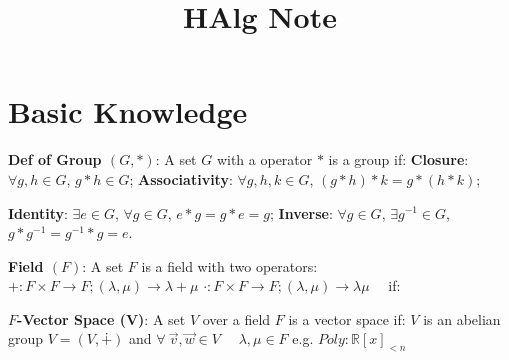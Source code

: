 \documentclass[9pt]{article}
\title{HAlg Note}
\author{}
\date{}
\begin{document}
\newcommand{\bij}{\stackrel{\sim}{\to}}
\newcommand{\oto}{\hookrightarrow}
\newcommand{\onto}{\twoheadrightarrow}

\maketitle
\thispagestyle{fancy}
\vspace{-3.5cm}

\fontsize{10pt}{11pt}\selectfont
\setlength{\parindent}{8pt}


\section{Basic Knowledge} %

\textbf{Def of Group $(G,*)$}: {\small A set $G$ with a operator $*$ is a group if: \textbf{Closure}: $\forall g,h\in G$, $g*h\in G$; \textbf{Associativity}: $\forall g,h,k\in G$, $(g*h)*k=g*(h*k)$;}

\hspace{85pt} {\small \textbf{Identity}: $\exists e\in G$, $\forall g\in G$, $e*g=g*e=g$; \textbf{Inverse}: $\forall g\in G$, $\exists g^{-1}\in G$, $g*g^{-1}=g^{-1}*g=e$.} 

\textbf{Field $(F)$}: {\small A set $F$ is a field with two operators: $+:F\times F\to F;(\lambda,\mu)\to\lambda+\mu$ $\cdot:F\times F\to F;(\lambda,\mu)\to\lambda\mu$ \ \ if:}

\quad \quad \quad {}

\textbf{$F$-Vector Space (V)}: {\small A set $V$ over a field $F$ is a vector space if: \quad $V$ is an abelian group $V=(V,\dotplus)$ and $\forall \ \vec{v},\vec{w}\in V$ \ \ $\lambda,\mu\in F$} \quad e.g. $Poly:\mathbb{R}[x]_{<n}$

\quad \quad \quad {}
\end{document}
